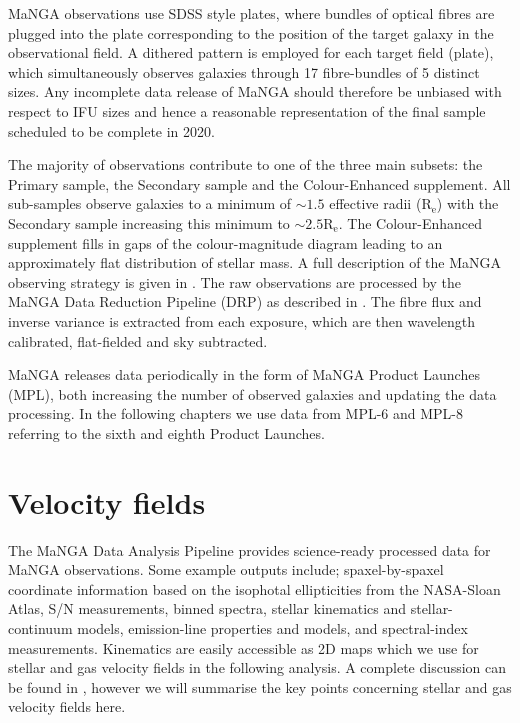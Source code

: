 MaNGA observations use SDSS style plates, where bundles of optical fibres are plugged into the plate corresponding to the position of the target galaxy in the observational field. A dithered pattern is employed for each target field (plate), which simultaneously observes galaxies through 17 fibre-bundles of 5 distinct sizes. Any incomplete data release of MaNGA should therefore be unbiased with respect to IFU sizes and hence a reasonable representation of the final sample scheduled to be complete in 2020.

The majority of observations contribute to one of the three main subsets: the Primary sample, the Secondary sample and the Colour-Enhanced supplement. All sub-samples observe galaxies to a minimum of $\sim 1.5$ effective radii ($\mathrm{R_{e}}$) with the Secondary sample increasing this minimum to $\sim 2.5 \mathrm{R_{e}}$. The Colour-Enhanced supplement fills in gaps of the colour-magnitude diagram leading to an approximately flat distribution of stellar mass. A full description of the MaNGA observing strategy is given in \citet{law2015obs,yan2016obs}. The raw observations are processed by the MaNGA Data Reduction Pipeline (DRP) as described in \citet{law2016drp, yan2016spec}. The fibre flux and inverse variance is extracted from each exposure, which are then wavelength calibrated, flat-fielded and sky subtracted.

MaNGA releases data periodically in the form of MaNGA Product Launches (MPL), both increasing the number of observed galaxies and updating the data processing. In the following chapters we use data from MPL-6 and MPL-8 referring to the sixth and eighth Product Launches.

\section{Velocity fields}
The MaNGA Data Analysis Pipeline \citep[DAP][]{westfall2019,belfiore2019} provides science-ready processed data for MaNGA observations. Some example outputs include; spaxel-by-spaxel coordinate information based on the isophotal ellipticities from the NASA-Sloan Atlas, S/N measurements, binned spectra, stellar kinematics and stellar-continuum models, emission-line properties and models, and spectral-index measurements. Kinematics are easily accessible as 2D maps which we use for stellar and gas velocity fields in the following analysis. A complete discussion can be found in \citet{westfall2019,belfiore2019}, however we will summarise the key points concerning stellar and gas velocity fields here.

